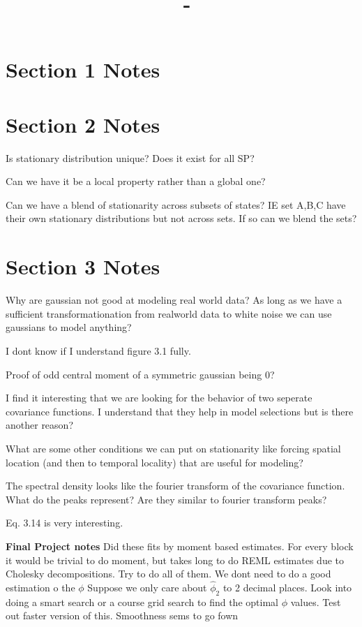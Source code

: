 \documentclass[answers,12pt,addpoints]{exam}
\author{\name}
\title{\course \ - \assignment}
\begin{document}
\maketitle
\tableofcontents
\newpage
\section{Section 1 Notes}

\section{Section 2 Notes}

Is stationary distribution unique? Does it exist for all SP?

Can we have it be a local property rather than a global one?

Can we have a blend of stationarity across subsets of states? IE set A,B,C have their own stationary distributions but not across sets. If so can we blend the sets?
\section{Section 3 Notes}
Why are gaussian not good at modeling real world data? As long as we have a sufficient transformationation from realworld data to white noise we can use gaussians to model anything?

I dont know if I understand figure 3.1 fully.

Proof of odd central moment of a symmetric gaussian being 0?

I find it interesting that we are looking for the behavior of two seperate covariance functions. I understand that they help in model selections but is there another reason?

What are some other conditions we can put on stationarity like forcing spatial location (and then to temporal locality) that are useful for modeling?

The spectral density looks like the fourier transform of the covariance function. What do the peaks represent? Are they similar to fourier transform peaks?

Eq. 3.14 is very interesting. 

\textbf{Final Project notes}
Did these fits by moment based estimates. For every block it would be trivial to do moment, but takes long to do REML estimates due to Cholesky decompositions. Try to do all of them. We dont need to do a good estimation o the $\phi$ Suppose we only care about $\hat \phi_2$ to 2 decimal places. Look into doing a smart search or a course grid search to find the optimal $\phi$ values. Test out faster version of this. Smoothness sems to go fown
\end{document}
